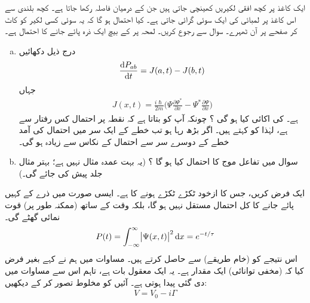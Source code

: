  ایک کاغذ پر کچھ افقی لکیریں کھینچی جاتی ہیں جن کے درمیان فاصلہ  رکھا جاتا ہے۔ کچھ بلندی سے اس کاغذ پر  لمبائی کی ایک سوئی گرائی جاتی ہے۔ کیا احتمال ہو گا کہ یہ سوئی کسی لکیر کو کاٹ کر صفحے پر آن ٹھہرے۔  سوال  سے رجوع کریں۔ 
 لمحہ  پر  کے بیچ ایک ذرہ پائے جانے کا احتمال  ہے۔ 
\begin{enumerate}[a.]
\item
 درج ذیل دکھائیں
\begin{align*}
\frac{ \dif P_{ab} }{ \dif t } = J ( a , t ) - J ( b , t )
\end{align*}
جہاں 
\begin{align*}
J( x , t ) = \frac{ i\hslash}{ 2 m } \big( \Psi \frac{ \partial \Psi^* }{ \partial x } - \Psi^* \frac{ \partial \Psi }{ \partial x } \big)
\end{align*}
ہے۔  کی اکائی کیا ہو گی ؟  چونکہ  آپ کو بتاتا ہے کہ نقطہ  پر احتمال کس رفتار سے  ہے، لہٰذا  کو  کہتے ہیں۔ اگر  بڑھ رہا ہو تب خطے کے ایک سر میں احتمال کی آمد خطے کے دوسرے سر سے احتمال کے نکاس سے زیادہ ہو گی۔ 
\item
 سوال  میں تفاعل موج کا احتمال  کیا ہو گا ؟ (یہ بہت عمدہ مثال نہیں ہے؛ بہتر مثال جلد پیش کی جائے گی۔)
\end{enumerate}
 ایک  فرض کریں، جس کا ازخود ٹکڑے ٹکڑے ہونے کا   ہے۔ ایسی صورت میں ذرے کے کہیں پائے جانے کا کل احتمال مستقل نہیں ہو گا، بلکہ وقت کے ساتھ (ممکنہ طور پر) قوت نمائی گھٹے گی۔
\begin{align*}
P(t) = \int_{-\infty }^{ \infty } \abs{\Psi ( x , t )}^2 \dif x=e^{-t/\tau}
\end{align*} 
 اس نتیجے کو (خام طریقے) سے حاصل کرتے ہیں۔ مساوات  میں ہم نے کہے بغیر فرض کیا کہ (مخفی توانائی)  ایک  مقدار ہے۔ یہ ایک معقول بات ہے، تاہم اس سے مساوات  میں دی گئی  پیدا ہوتی ہے۔ آئیں  کو مخلوط تصور کر کے دیکھیں:
\begin{align*}
V = V_0 - i \Gamma
\end{align*}
